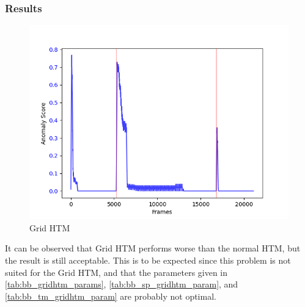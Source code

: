 \subsubsection{Results}
\begin{figure}[H]
    \centering
    \includegraphics[width=\textwidth]{resources/experiments/bouncing_ball/bb_grid.png}
    \caption{Grid HTM}
\end{figure}
It can be observed that Grid HTM performs worse than the normal HTM, but the result is still acceptable. This is to be expected since this problem is not suited for the Grid HTM, and that the parameters given in \autoref{tab:bb_gridhtm_params}, \autoref{tab:bb_sp_gridhtm_param}, and \autoref{tab:bb_tm_gridhtm_param} are probably not optimal.
